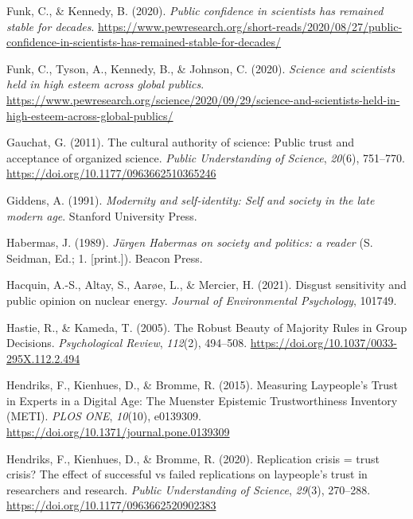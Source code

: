 \documentclass[
  jou,
  floatsintext,
  longtable,
  nolmodern,
  notxfonts,
  notimes,
  colorlinks=true,linkcolor=blue,citecolor=blue,urlcolor=blue]{apa7}
\newlength{\cslhangindent}
\newenvironment{CSLReferences}[2] %
 {\begin{list}{}{%
  \setlength{\itemindent}{0pt}
  \setlength{\leftmargin}{0pt}
  \setlength{\parsep}{0pt}
  \ifodd #1
   \setlength{\leftmargin}{\cslhangindent}
   \setlength{\itemindent}{-1\cslhangindent}
  \fi
  \setlength{\itemsep}{#2\baselineskip}}}
 {\end{list}}
\begin{document}
\begin{CSLReferences}{1}{0}
Funk, C., \& Kennedy, B. (2020). \emph{Public confidence in scientists
has remained stable for decades}.
\url{https://www.pewresearch.org/short-reads/2020/08/27/public-confidence-in-scientists-has-remained-stable-for-decades/}

Funk, C., Tyson, A., Kennedy, B., \& Johnson, C. (2020). \emph{Science
and scientists held in high esteem across global publics}.
\url{https://www.pewresearch.org/science/2020/09/29/science-and-scientists-held-in-high-esteem-across-global-publics/}

Gauchat, G. (2011). The cultural authority of science: Public trust and
acceptance of organized science. \emph{Public Understanding of Science},
\emph{20}(6), 751--770. \url{https://doi.org/10.1177/0963662510365246}

Giddens, A. (1991). \emph{Modernity and self-identity: Self and society
in the late modern age}. Stanford University Press.

Habermas, J. (1989). \emph{Jürgen Habermas on society and politics: a
reader} (S. Seidman, Ed.; 1. {[}print.{]}). Beacon Press.

Hacquin, A.-S., Altay, S., Aarøe, L., \& Mercier, H. (2021). Disgust
sensitivity and public opinion on nuclear energy. \emph{Journal of
Environmental Psychology}, 101749.

Hastie, R., \& Kameda, T. (2005). The Robust Beauty of Majority Rules in
Group Decisions. \emph{Psychological Review}, \emph{112}(2), 494--508.
\url{https://doi.org/10.1037/0033-295X.112.2.494}

Hendriks, F., Kienhues, D., \& Bromme, R. (2015). Measuring
Laypeople{'}s Trust in Experts in a Digital Age: The Muenster Epistemic
Trustworthiness Inventory (METI). \emph{PLOS ONE}, \emph{10}(10),
e0139309. \url{https://doi.org/10.1371/journal.pone.0139309}

Hendriks, F., Kienhues, D., \& Bromme, R. (2020). Replication crisis =
trust crisis? The effect of successful vs failed replications on
laypeople{'}s trust in researchers and research. \emph{Public
Understanding of Science}, \emph{29}(3), 270--288.
\url{https://doi.org/10.1177/0963662520902383}


\end{CSLReferences}
\end{document}
